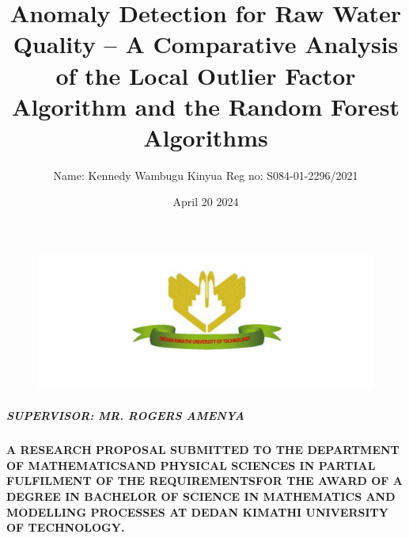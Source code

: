 \documentclass{article}
\begin{document}
\begin{figure}
\begin{center}
	
	\includegraphics{dekut.png}
\end{center}
\end{figure}
\title{Anomaly Detection for Raw Water Quality – A
	Comparative Analysis of the Local Outlier Factor
	Algorithm and the Random Forest Algorithms}
\author{Name: Kennedy Wambugu Kinyua Reg no: S084-01-2296/2021}
\date{April 20 2024}
\maketitle

	\begin{center}
		\subparagraph{\textbf{SUPERVISOR: MR. ROGERS AMENYA}}
		 \textbf{A RESEARCH PROPOSAL SUBMITTED TO THE DEPARTMENT OF MATHEMATICSAND PHYSICAL SCIENCES IN PARTIAL FULFILMENT OF THE REQUIREMENTSFOR THE AWARD OF A DEGREE IN BACHELOR OF SCIENCE IN MATHEMATICS AND MODELLING PROCESSES AT DEDAN KIMATHI UNIVERSITY OF TECHNOLOGY.}
	 \end{center}	
	
	
	
	
	
	\newpage
	
\end{document}
